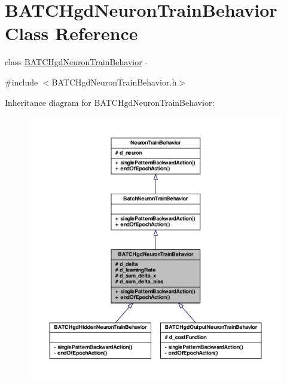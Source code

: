 \hypertarget{class_b_a_t_c_hgd_neuron_train_behavior}{
\section{BATCHgdNeuronTrainBehavior Class Reference}
\label{class_b_a_t_c_hgd_neuron_train_behavior}
}


class \hyperlink{class_b_a_t_c_hgd_neuron_train_behavior}{BATCHgdNeuronTrainBehavior} -\/  




{\ttfamily \#include $<$BATCHgdNeuronTrainBehavior.h$>$}



Inheritance diagram for BATCHgdNeuronTrainBehavior:
\nopagebreak
\begin{figure}[H]
\begin{center}
\leavevmode
\includegraphics[width=400pt]{class_b_a_t_c_hgd_neuron_train_behavior__inherit__graph}
\end{center}
\end{figure}


